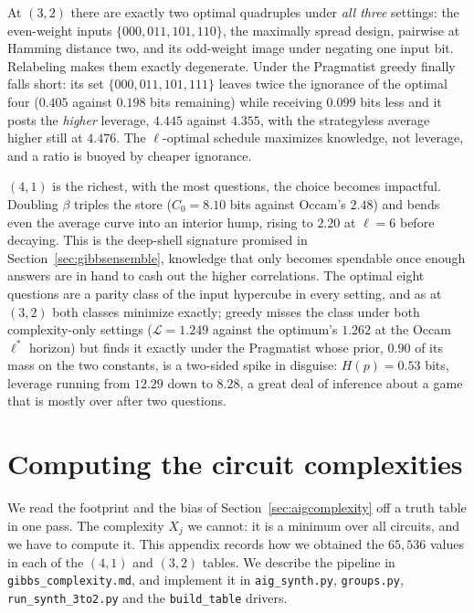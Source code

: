 \documentclass[11pt]{article}
\let\stdsection\section
\renewcommand{\section}{\clearpage\stdsection}
\begin{document}
At $(3,2)$ there are exactly two optimal quadruples under \emph{all
three} settings: the even-weight inputs $\{000, 011, 101, 110\}$, the
maximally spread design, pairwise at Hamming distance two, and its
odd-weight image under negating one input bit. Relabeling makes them
exactly degenerate. Under the Pragmatist greedy
finally falls short: its set $\{000, 011, 101, 111\}$ leaves twice the
ignorance of the optimal four ($0.405$ against $0.198$ bits
remaining) while receiving $0.099$ bits less and it posts the
\emph{higher} leverage, $4.445$ against $4.355$, with the
strategyless average higher still at $4.476$. The $\ell$-optimal
schedule maximizes knowledge, not leverage, and a ratio is buoyed by 
cheaper ignorance.

$(4,1)$ is the richest, with the most questions, the choice becomes
impactful. Doubling $\beta$
triples the store ($C_0 = 8.10$ bits against Occam's $2.48$) and
bends even the average curve into an interior hump, rising to
$2.20$ at $\ell = 6$ before decaying. This is the deep-shell signature
promised in Section~\ref{sec:gibbsensemble}, knowledge that only
becomes spendable once enough answers are in hand to cash out the
higher correlations. The optimal eight questions are a parity class
of the input hypercube in every setting, and as at $(3,2)$ both
classes minimize exactly; greedy misses the class
under both complexity-only settings ($\mathcal L = 1.249$ against the optimum's
$1.262$ at the Occam $\ell^*$ horizon) but finds it exactly under the
Pragmatist whose prior, $0.90$ of its mass on the two constants,
is a two-sided spike in disguise: $H(p) = 0.53$ bits, leverage
running from $12.29$ down to $8.28$, a great deal of inference
about a game that is mostly over after two questions.


\section{Computing the circuit complexities}\label{app:aig}

We read the footprint and the bias of
Section~\ref{sec:aigcomplexity} off a truth table in one pass. The
complexity $X_j$ we cannot: it is a minimum over all circuits, and we
have to compute it. This appendix records how we obtained the
$65{,}536$ values in each of the $(4,1)$ and $(3,2)$
tables. We describe the pipeline in
\texttt{gibbs\_complexity.md}, and implement it in
\texttt{aig\_synth.py}, \texttt{groups.py},
\texttt{run\_synth\_3to2.py} and the
\texttt{build\_table} drivers.
\end{document}
